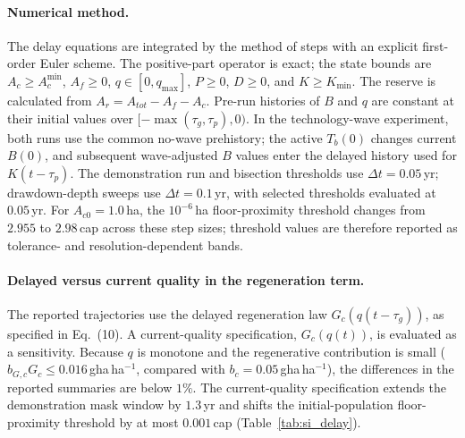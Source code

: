 \documentclass[11pt,a4paper]{article}
\newcommand{\Acmin}{A_c^{\min}}
\begin{document}
\paragraph{Numerical method.} The delay equations are integrated by the method of steps with an explicit first-order Euler scheme. The positive-part operator is exact; the state bounds are $A_c\ge\Acmin$, $A_f\ge0$, $q\in[0,q_{\max}]$, $P\ge0$, $D\ge0$, and $K\ge K_{\min}$. The reserve is calculated from $A_r=A_{tot}-A_f-A_c$. Pre-run histories of $B$ and $q$ are constant at their initial values over $[-\max(\tau_g,\tau_p),0)$. In the technology-wave experiment, both runs use the common no-wave prehistory; the active $T_b(0)$ changes current $B(0)$, and subsequent wave-adjusted $B$ values enter the delayed history used for $K(t-\tau_p)$. The demonstration run and bisection thresholds use $\Delta t=0.05$\,yr; drawdown-depth sweeps use $\Delta t=0.1$\,yr, with selected thresholds evaluated at $0.05$\,yr. For $A_{c0}=1.0$\,ha, the $10^{-6}$\,ha floor-proximity threshold changes from $2.955$ to $2.98$\,cap across these step sizes; threshold values are therefore reported as tolerance- and resolution-dependent bands.

\paragraph{Delayed versus current quality in the regeneration term.} The reported trajectories use the delayed regeneration law $G_c(q(t-\tau_g))$, as specified in Eq.~(10). A current-quality specification, $G_c(q(t))$, is evaluated as a sensitivity. Because $q$ is monotone and the regenerative contribution is small ($b_{G,c}G_c\le0.016$\,gha\,ha$^{-1}$, compared with $b_c=0.05$\,gha\,ha$^{-1}$), the differences in the reported summaries are below $1\%$. The current-quality specification extends the demonstration mask window by $1.3$\,yr and shifts the initial-population floor-proximity threshold by at most $0.001$\,cap (Table~\ref{tab:si_delay}).
\end{document}
